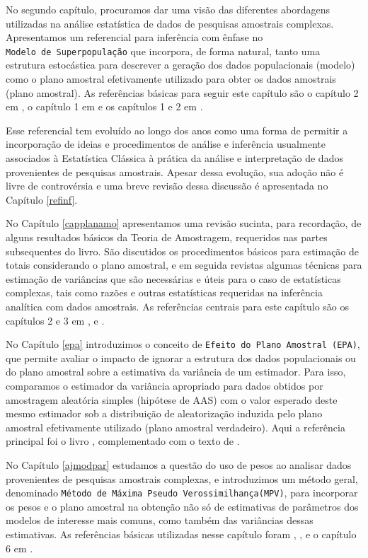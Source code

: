 \documentclass[]{book}
\theoremstyle{definition}
\theoremstyle{definition}
\theoremstyle{definition}
\theoremstyle{remark}
\begin{document}
No segundo capítulo, procuramos dar uma visão das diferentes abordagens
utilizadas na análise estatística de dados de pesquisas amostrais
complexas. Apresentamos um referencial para inferência com ênfase no
\texttt{Modelo\ de\ Superpopulação} que incorpora, de forma natural,
tanto uma estrutura estocástica para descrever a geração dos dados
populacionais (modelo) como o plano amostral efetivamente utilizado para
obter os dados amostrais (plano amostral). As referências básicas para
seguir este capítulo são o capítulo 2 em \citep{Silva}, o capítulo 1 em
\citep{SHS89} e os capítulos 1 e 2 em \citep{CHSK2003}.

Esse referencial tem evoluído ao longo dos anos como uma forma de
permitir a incorporação de ideias e procedimentos de análise e
inferência usualmente associados à Estatística Clássica à prática da
análise e interpretação de dados provenientes de pesquisas amostrais.
Apesar dessa evolução, sua adoção não é livre de controvérsia e uma
breve revisão dessa discussão é apresentada no Capítulo \ref{refinf}.

No Capítulo \ref{capplanamo} apresentamos uma revisão sucinta, para
recordação, de alguns resultados básicos da Teoria de Amostragem,
requeridos nas partes subsequentes do livro. São discutidos os
procedimentos básicos para estimação de totais considerando o plano
amostral, e em seguida revistas algumas técnicas para estimação de
variâncias que são necessárias e úteis para o caso de estatísticas
complexas, tais como razões e outras estatísticas requeridas na
inferência analítica com dados amostrais. As referências centrais para
este capítulo são os capítulos 2 e 3 em \citep{SSW92}, \citep{W85} e
\citep{cochran}.

No Capítulo \ref{epa} introduzimos o conceito de
\texttt{Efeito\ do\ Plano\ Amostral\ (EPA)}, que permite avaliar o
impacto de ignorar a estrutura dos dados populacionais ou do plano
amostral sobre a estimativa da variância de um estimador. Para isso,
comparamos o estimador da variância apropriado para dados obtidos por
amostragem aleatória simples (hipótese de AAS) com o valor esperado
deste mesmo estimador sob a distribuição de aleatorização induzida pelo
plano amostral efetivamente utilizado (plano amostral verdadeiro). Aqui
a referência principal foi o livro \citep{SHS89}, complementado com o
texto de \citep{lethonen}.

No Capítulo \ref{ajmodpar} estudamos a questão do uso de pesos ao
analisar dados provenientes de pesquisas amostrais complexas, e
introduzimos um método geral, denominado
\texttt{Método\ de\ Máxima\ Pseudo\ Verossimilhança(MPV)}, para
incorporar os pesos e o plano amostral na obtenção não só de estimativas
de parâmetros dos modelos de interesse mais comuns, como também das
variâncias dessas estimativas. As referências básicas utilizadas nesse
capítulo foram \citep{SHS89}, \citep{Pfeff}, \citep{binder83} e o
capítulo 6 em \citep{Silva}.
\end{document}
